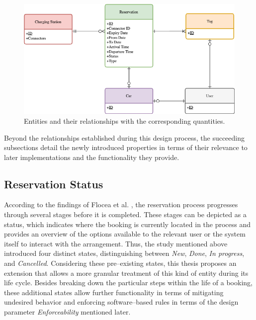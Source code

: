 \begin{figure}[h]
    \centering
    \includegraphics[scale=0.4]{resources/images/main/5_design/Entities.png}
    \caption{Entities and their relationships with the corresponding quantities.}
    \label{fig:entity-relationship-diagram}
\end{figure}

\noindent Beyond the relationships established during this design process, the succeeding subsections detail the newly introduced properties in terms of their relevance to later implementations and the functionality they provide.

\subsection{Reservation Status}
\label{ch:Design:sec:Reservation:ssec:Reservation Status}

According to the findings of Flocea et al. \cite{flocea_electric_2022}, the reservation process progresses through several stages before it is completed. These stages can be depicted as a status, which indicates where the booking is currently located in the process and provides an overview of the options available to the relevant user or the system itself to interact with the arrangement.
Thus, the study mentioned above introduced four distinct states, distinguishing between \textit{New}, \textit{Done}, \textit{In progress}, and \textit{Cancelled}.
Considering these pre--existing states, this thesis proposes an extension that allows a more granular treatment of this kind of entity during its life cycle. Besides breaking down the particular steps within the life of a booking, these additional states allow further functionality in terms of mitigating undesired behavior and enforcing software--based rules in terms of the design parameter \textit{Enforceability} mentioned later.

